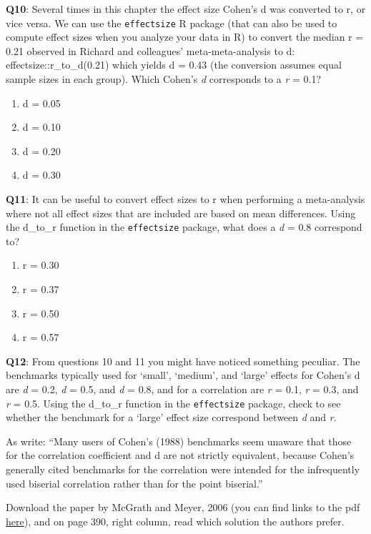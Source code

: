 \documentclass[
]{krantz}
\providecommand{\tightlist}{%
  \setlength{\itemsep}{0pt}\setlength{\parskip}{0pt}}
\begin{document}
\textbf{Q10}: Several times in this chapter the effect size Cohen's d was converted to r, or vice versa. We can use the \texttt{effectsize} R package (that can also be used to compute effect sizes when you analyze your data in R) to convert the median r = 0.21 observed in Richard and colleagues' meta-meta-analysis to d: effectsize::r\_to\_d(0.21) which yields d = 0.43 (the conversion assumes equal sample sizes in each group). Which Cohen's \emph{d} corresponds to a \emph{r} = 0.1?

\begin{enumerate}
\def\labelenumi{\Alph{enumi})}
\tightlist
\item
  d = 0.05
\item
  d = 0.10
\item
  d = 0.20
\item
  d = 0.30
\end{enumerate}

\textbf{Q11}: It can be useful to convert effect sizes to r when performing a meta-analysis where not all effect sizes that are included are based on mean differences. Using the d\_to\_r function in the \texttt{effectsize} package, what does a \emph{d} = 0.8 correspond to?

\begin{enumerate}
\def\labelenumi{\Alph{enumi})}
\tightlist
\item
  r = 0.30
\item
  r = 0.37
\item
  r = 0.50
\item
  r = 0.57
\end{enumerate}

\textbf{Q12}: From questions 10 and 11 you might have noticed something peculiar. The benchmarks typically used for `small', `medium', and `large' effects for Cohen's d are \emph{d} = 0.2, \emph{d} = 0.5, and \emph{d} = 0.8, and for a correlation are \emph{r} = 0.1, \emph{r} = 0.3, and \emph{r} = 0.5. Using the d\_to\_r function in the \texttt{effectsize} package, check to see whether the benchmark for a `large' effect size correspond between \emph{d} and \emph{r}.

As \citet{mcgrath_when_2006} write: ``Many users of Cohen's (1988) benchmarks seem unaware that those for the correlation coefficient and d are not strictly equivalent, because Cohen's generally cited benchmarks for the correlation were intended for the infrequently used biserial correlation rather than for the point biserial.''

Download the paper by McGrath and Meyer, 2006 (you can find links to the pdf \href{https://scholar.google.com/scholar?cluster=18022919125620514097\&as_sdt=0\%2C5\&inst=1903264034810781805}{here}), and on page 390, right column, read which solution the authors prefer.
\end{document}

